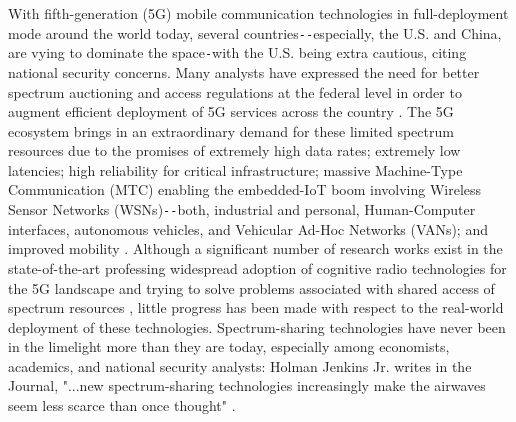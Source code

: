 \documentclass[12pt, draftcls, onecolumn]{IEEEtran}
\begin{document}
With fifth-generation (5G) mobile communication technologies in full-deployment mode around the world today, several countries\texttt{-{}-}especially, the U.S. and China, are vying to dominate the space\texttt{-}with the U.S. being extra cautious, citing national security concerns. Many analysts have expressed the need for better spectrum auctioning and access regulations at the federal level in order to augment efficient deployment of 5G services across the country \cite{WSJ:5Gdominance}. The 5G ecosystem brings in an extraordinary demand for these limited spectrum resources due to the promises of extremely high data rates; extremely low latencies; high reliability for critical infrastructure; massive Machine-Type Communication (MTC) enabling the embedded-IoT boom involving Wireless Sensor Networks (WSNs)\texttt{-{}-}both, industrial and personal, Human-Computer interfaces, autonomous vehicles, and Vehicular Ad-Hoc Networks (VANs); and improved mobility \cite{WCL:1,Ericsson:5Gusecases}. Although a significant number of research works exist in the state-of-the-art professing widespread adoption of cognitive radio technologies for the 5G landscape and trying to solve problems associated with shared access of spectrum resources \cite{WCL:7,WCL:6,WCL:4,WCL:5,WCL:9,WCL:10,WCL:11}, little progress has been made with respect to the real-world deployment of these technologies. Spectrum-sharing technologies have never been in the limelight more than they are today, especially among economists, academics, and national security analysts: Holman Jenkins Jr. writes in the Journal, "...new spectrum-sharing technologies increasingly make the airwaves seem less scarce than once thought" \cite{WSJ:HolmanJenkinsJr.}.
\end{document}
